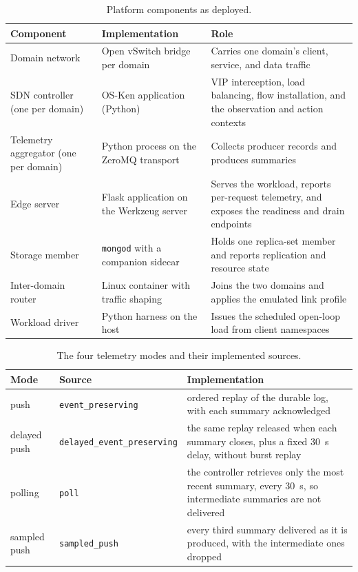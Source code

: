 ﻿\documentclass[12pt,reqno,twoside]{amsbook}
\begin{document}
{\begin{table}[H]
    \centering
    \caption{Platform components as deployed.}
    \label{tab:impl_components}
    \footnotesize
    \begin{tabular}{p{} p{} p{}}
        \toprule
        Component & Implementation & Role \\
        \midrule
        Domain network & Open vSwitch bridge per domain & Carries one domain's client, service, and data traffic \\
        SDN controller (one per domain) & OS-Ken application (Python) & VIP interception, load balancing, flow installation, and the observation and action contexts \\
        Telemetry aggregator (one per domain) & Python process on the ZeroMQ transport & Collects producer records and produces summaries \\
        Edge server & Flask application on the Werkzeug server & Serves the workload, reports per-request telemetry, and exposes the readiness and drain endpoints \\
        Storage member & \texttt{mongod} with a companion sidecar & Holds one replica-set member and reports replication and resource state \\
        Inter-domain router & Linux container with traffic shaping & Joins the two domains and applies the emulated link profile \\
        Workload driver & Python harness on the host & Issues the scheduled open-loop load from client namespaces \\
        \bottomrule
    \end{tabular}
\end{table}

\begin{table}[H]
    \centering
    \caption{The four telemetry modes and their implemented sources.}
    \label{tab:impl_delivery_sources}
    \footnotesize
    \begin{tabular}{p{} p{} p{}}
        \toprule
        Mode & Source & Implementation \\
        \midrule
        push & \texttt{event\_preserving} & ordered replay of the durable log, with each summary acknowledged \\
        delayed push & \texttt{delayed\_event\_preserving} & the same replay released when each summary closes, plus a fixed 30~s delay, without burst replay \\
        polling & \texttt{poll} & the controller retrieves only the most recent summary, every 30~s, so intermediate summaries are not delivered \\
        sampled push & \texttt{sampled\_push} & every third summary delivered as it is produced, with the intermediate ones dropped \\
        \bottomrule
    \end{tabular}
\end{table}

}
\end{document}
